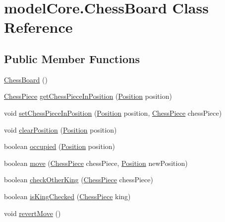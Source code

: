 \hypertarget{classmodel_core_1_1_chess_board}{\section{model\+Core.\+Chess\+Board Class Reference}
\label{classmodel_core_1_1_chess_board}
}
\subsection*{Public Member Functions}
\begin{DoxyCompactItemize}
\item 
\hyperlink{classmodel_core_1_1_chess_board_a50f1163eb1a59a7193668a8d1cf89435}{Chess\+Board} ()
\item 
\hyperlink{classmodel_chess_pieces_1_1_chess_piece}{Chess\+Piece} \hyperlink{classmodel_core_1_1_chess_board_ad700d180ac71927b8fd0e5c3e09ddd2b}{get\+Chess\+Piece\+In\+Position} (\hyperlink{classmodel_core_1_1_position}{Position} position)
\item 
void \hyperlink{classmodel_core_1_1_chess_board_af1a00d0d402bde8b8b5e5a23a96e6374}{set\+Chess\+Piece\+In\+Position} (\hyperlink{classmodel_core_1_1_position}{Position} position, \hyperlink{classmodel_chess_pieces_1_1_chess_piece}{Chess\+Piece} chess\+Piece)
\item 
void \hyperlink{classmodel_core_1_1_chess_board_a59800c1635a93d08909d34814bfffd20}{clear\+Position} (\hyperlink{classmodel_core_1_1_position}{Position} position)
\item 
boolean \hyperlink{classmodel_core_1_1_chess_board_abf420a5f1ea25fe7a8c6cdce3427c0af}{occupied} (\hyperlink{classmodel_core_1_1_position}{Position} position)
\item 
boolean \hyperlink{classmodel_core_1_1_chess_board_ab9216efa0fa5ce7794f813a500887647}{move} (\hyperlink{classmodel_chess_pieces_1_1_chess_piece}{Chess\+Piece} chess\+Piece, \hyperlink{classmodel_core_1_1_position}{Position} new\+Position)
\item 
boolean \hyperlink{classmodel_core_1_1_chess_board_a65d2495b5efc7db5a62e8af13ca0dda0}{check\+Other\+King} (\hyperlink{classmodel_chess_pieces_1_1_chess_piece}{Chess\+Piece} chess\+Piece)
\item 
boolean \hyperlink{classmodel_core_1_1_chess_board_a031a84fd458cb11464d0eadc6317b945}{is\+King\+Checked} (\hyperlink{classmodel_chess_pieces_1_1_chess_piece}{Chess\+Piece} king)
\item 
void \hyperlink{classmodel_core_1_1_chess_board_ad1bf119fff1c4af0b315c00ccec4c40b}{revert\+Move} ()

\end{DoxyCompactItemize}
